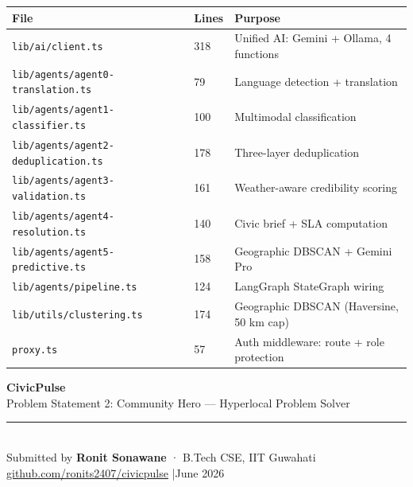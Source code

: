 \documentclass[11pt,a4paper]{article}
\newcommand{\thead}[1]{{\color{white}\bfseries\sffamily #1}}
\newcommand{\file}[1]{\texttt{\footnotesize\color{cpgray}#1}}
\begin{document}
\begin{tabular}{@{} L{6.5cm} C{1cm} L{6.5cm} @{}}
\toprule
{}
\thead{File} & \thead{Lines} & \thead{Purpose} \\
\midrule
\file{lib/ai/client.ts}                       & 318 & Unified AI: Gemini + Ollama, 4 functions \\
\file{lib/agents/agent0-translation.ts}        & 79  & Language detection + translation \\
\file{lib/agents/agent1-classifier.ts}         & 100 & Multimodal classification \\
\file{lib/agents/agent2-deduplication.ts}      & 178 & Three-layer deduplication \\
\file{lib/agents/agent3-validation.ts}         & 161 & Weather-aware credibility scoring \\
\file{lib/agents/agent4-resolution.ts}         & 140 & Civic brief + SLA computation \\
\file{lib/agents/agent5-predictive.ts}         & 158 & Geographic DBSCAN + Gemini Pro \\
\file{lib/agents/pipeline.ts}                  & 124 & LangGraph StateGraph wiring \\
\file{lib/utils/clustering.ts}                 & 174 & Geographic DBSCAN (Haversine, 50 km cap) \\
\file{proxy.ts}                                & 57  & Auth middleware: route + role protection \\
\bottomrule
\end{tabular}

\vspace*{\fill}
\begin{center}
\begin{tcolorbox}[
  enhanced, colback=cpblue!4, colframe=cpblue!8,
  boxrule=0.5pt, arc=6pt,
  left=15pt, right=15pt, top=12pt, bottom=12pt,
  width=0.85\linewidth,
  drop shadow={shadow xshift=0mm, shadow yshift=-1mm, opacity=0.15}
]
\centering
{\sffamily\bfseries\color{cpblue}\large CivicPulse}\\[4pt]
{\sffamily\color{cpgray}\small Problem Statement 2: Community Hero — Hyperlocal Problem Solver}\\[10pt]
{\color{cpteal}\rule{0.4\linewidth}{0.8pt}}\\[10pt]
{\sffamily\footnotesize\color{cpgray}Submitted by \textbf{Ronit Sonawane} · B.Tech CSE, IIT Guwahati}\\[2pt]
{\sffamily\scriptsize\color{cpgray!80}\href{https://github.com/ronits2407/civicpulse}{github.com/ronits2407/civicpulse} \quad |\quad June 2026}
\end{tcolorbox}
\end{center}
\end{document}
